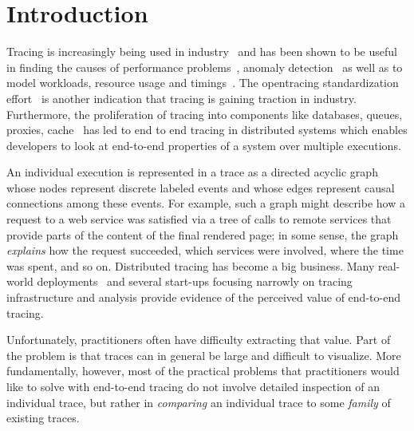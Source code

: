 \section{Introduction}


 Tracing is increasingly being used in industry~\cite{Jaeger, Zipkin, 36356} and has been shown to be useful in finding the causes of performance problems~\cite{36356, Fonseca:2007:XPN:1973430.1973450, Reynolds:2006:PDU:1267680.1267689, DBLP:conf/sigmetrics/ThereskaSSWALG06, Sambasivan:2011:DPC:1972457.1972463}, anomaly detection~\cite{Barham:2003:MOM:1251054.1251069, Chen:2004:PFE:1251175.1251198, 37477, Sambasivan:2011:DPC:1972457.1972463} as well as to model workloads, resource usage and timings~\cite{Mann:2011:MPE:2170444.2170464, Chanda:2007:WTP:1272996.1273001, 36356, DBLP:conf/sigmetrics/ThereskaSSWALG06, Barham:2003:MOM:1251054.1251069}. The opentracing standardization effort~\cite{OpenTracing} is another indication that tracing is gaining traction in industry. Furthermore, the proliferation of tracing into components like databases, queues, proxies, cache~\cite{OpenTracingCassandra, OpenTracingKafka, OpenTracingRedis} has led to end to end tracing in distributed systems which enables developers to look at end-to-end properties of a system over multiple executions.

An individual execution is represented in a trace as a directed acyclic graph whose nodes represent discrete labeled events and whose edges represent causal connections among these events.  For example, such a graph might describe how a request to a web service was satisfied via a tree of calls to remote services that provide parts of the 
content of the final rendered page; in some sense, the graph \emph{explains} how the request succeeded, which services were involved, where the time was spent, and so on. Distributed tracing has become a big business.  Many real-world deployments~ and several start-ups focusing narrowly on tracing infrastructure and analysis provide evidence of the perceived value of end-to-end tracing.  

Unfortunately, practitioners often have difficulty extracting that value. Part of the problem is that traces can in general be large and difficult to visualize.  More fundamentally, however, most of the practical problems that practitioners would like to solve with end-to-end tracing do not involve detailed inspection of an individual trace, but rather in \emph{comparing} an individual trace to some \emph{family} of existing traces. 

